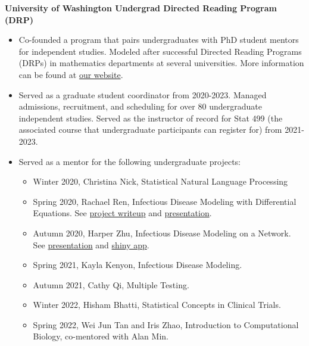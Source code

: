 \documentclass[margin, 10pt]{res} %
\begin{document}
\begin{resume}
{\textbf{University of Washington Undergrad Directed Reading Program (DRP)}}
\begin{itemize}
  \item Co-founded a program that pairs undergraduates with PhD student mentors for independent studies. Modeled after successful Directed Reading Programs (DRPs) in mathematics departments at several universities. More information can be found at \href{https://spa-drp.github.io}{our website}. 
  \item Served as a graduate student coordinator from 2020-2023. Managed admissions, recruitment, and scheduling for over 80 undergraduate independent studies. Served as the instructor of record for Stat 499 (the associated course that undergraduate participants can register for) from 2021-2023. 
  \item Served as a mentor for the following undergraduate projects:
  \begin{itemize}
  \item Winter 2020, Christina Nick, Statistical Natural Language Processing
  \item Spring 2020, Rachael Ren, Infectious Disease Modeling with Differential Equations. See \href{https://spa-drp.github.io/writeups/spring2020/rachael.pdf}{project writeup} and \href{https://spa-drp.github.io/writeups/spring2020/rachaelslides.pdf}{presentation}.
  \item Autumn 2020, Harper Zhu, Infectious Disease Modeling on a Network.  See \href{https://spa-drp.github.io/writeups/aut2020/harper-slides.pdf}{presentation} and \href{https://harperzhu.shinyapps.io/DiseaseSimulation/}{shiny app}.
  \item Spring 2021, Kayla Kenyon, Infectious Disease Modeling. 
  \item Autumn 2021, Cathy Qi, Multiple Testing. 
  \item Winter 2022, Hisham Bhatti, Statistical Concepts in Clinical Trials.
 \item Spring 2022, Wei Jun Tan and Iris Zhao, Introduction to Computational Biology, co-mentored with Alan Min. 
 \end{itemize}
 \end{itemize}


\end{resume}
\end{document}
